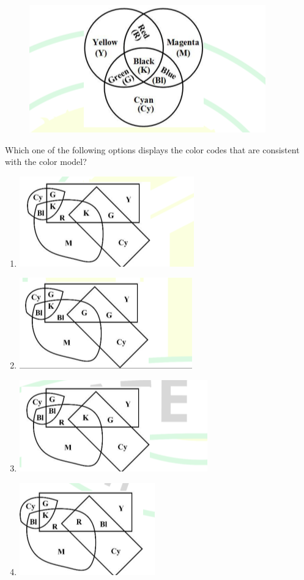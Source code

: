 \documentclass[journal,12pt,onecolumn]{IEEEtran}
\theoremstyle{remark}
\begin{document}
\begin{enumerate}
		\begin{figure}[h]
			\centering
			\includegraphics[width=0.4\columnwidth]{q8.png}
			\caption*{}
			\label{fig:q8}
		\end{figure}
		Which one of the following options displays the color codes that are consistent with the color model?
		
		\hfill{}
		
		\begin{enumerate}
			\item \includegraphics[width=0.7\columnwidth]{q8A.png}
			\item \includegraphics[width=0.7\columnwidth]{q8B.png}
			\item \includegraphics[width=0.7\columnwidth]{q8C.png}
			\item \includegraphics[width=0.7\columnwidth]{q8D.png}

\end{enumerate}
\end{enumerate}
\end{document}
